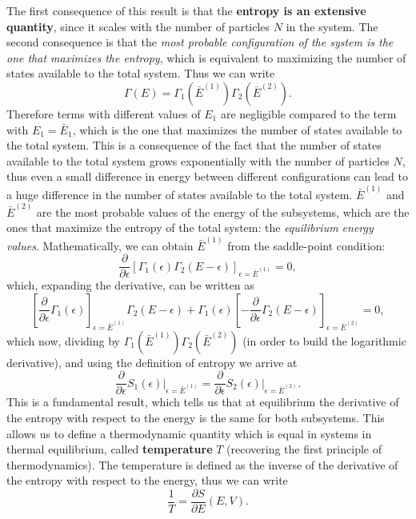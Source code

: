 The first consequence of this result is that the \textbf{entropy is an extensive quantity}, since it scales with the number of particles \(N\) in the system. The second consequence is that the \textit{most probable configuration of the system is the one that maximizes the entropy}, which is equivalent to maximizing the number of states available to the total system. Thus we can write
\[
    \Gamma(E) = \Gamma_1(\bar{E}^{(1)}) \Gamma_2(\bar{E}^{(2)}).
\]
Therefore terms with different values of \(E_1\) are negligible compared to the term with \(E_1 = \bar{E}_1\), which is the one that maximizes the number of states available to the total system. This is a consequence of the fact that the number of states available to the total system grows exponentially with the number of particles \(N\), thus even a small difference in energy between different configurations can lead to a huge difference in the number of states available to the total system. \(\bar{E}^{(1)}\) and \(\bar{E}^{(2)}\) are the most probable values of the energy of the subsystems, which are the ones that maximize the entropy of the total system: the \textit{equilibrium energy values}. Mathematically, we can obtain \(\bar{E}^{(1)}\) from the saddle-point condition:
\[
    \frac{\partial}{\partial \epsilon} \left[ \Gamma_1(\epsilon) \Gamma_2(E - \epsilon) \right]_{\epsilon = \bar{E}^{(1)}} = 0,
\]
which, expanding the derivative, can be written as
\[
    \left[ \frac{\partial}{\partial \epsilon} \Gamma_1(\epsilon) \right]_{\epsilon = \bar{E}^{(1)}} \Gamma_2(E - \epsilon) + \Gamma_1(\epsilon) \left[ - \frac{\partial}{\partial \epsilon} \Gamma_2(E - \epsilon) \right]_{\epsilon = \bar{E}^{(2)}} = 0,
\]
which now, dividing by \(\Gamma_1(\bar{E}^{(1)}) \Gamma_2(\bar{E}^{(2)})\) (in order to build the logarithmic derivative), and using the definition of entropy we arrive at
\[
    \frac{\partial}{\partial \epsilon} S_1 (\epsilon) \bigg|_{\epsilon = \bar{E}^{(1)}} = \frac{\partial}{\partial \epsilon} S_2(\epsilon) \bigg|_{\epsilon = \bar{E}^{(2)}}.
\]
This is a fundamental result, which tells us that at equilibrium the derivative of the entropy with respect to the energy is the same for both subsystems. This allows us to define a thermodynamic quantity which is equal in systems in thermal equilibrium, called \textbf{temperature} \(T\) (recovering the first principle of thermodynamics). The temperature is defined as the inverse of the derivative of the entropy with respect to the energy, thus we can write
\[
    \frac{1}{T} = \frac{\partial S}{\partial E}(E, V).
\]

